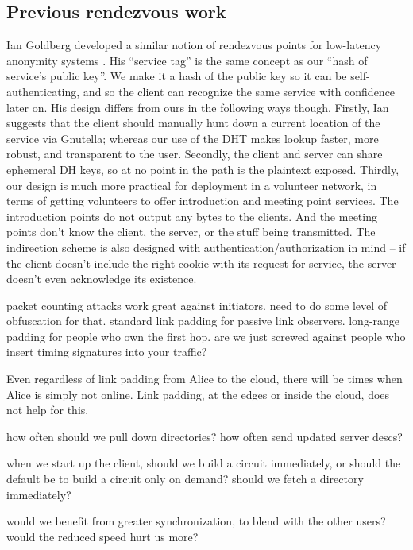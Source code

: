 \documentclass[times,10pt,twocolumn]{article}
\begin{document}
\subsection{Previous rendezvous work}

Ian Goldberg developed a similar notion of rendezvous points for
low-latency anonymity systems \cite{ian-thesis}. His ``service tag''
is the same concept as our ``hash of service's public key''. We make it
a hash of the public key so it can be self-authenticating, and so the
client can recognize the same service with confidence later on. His
design differs from ours in the following ways though. Firstly, Ian
suggests that the client should manually hunt down a current location of
the service via Gnutella; whereas our use of the DHT makes lookup faster,
more robust, and transparent to the user. Secondly, the client and server
can share ephemeral DH keys, so at no point in the path is the plaintext
exposed. Thirdly, our design is much more practical for deployment in a
volunteer network, in terms of getting volunteers to offer introduction
and meeting point services. The introduction points do not output any
bytes to the clients. And the meeting points don't know the client,
the server, or the stuff being transmitted. The indirection scheme
is also designed with authentication/authorization in mind -- if the
client doesn't include the right cookie with its request for service,
the server doesn't even acknowledge its existence.

\label{sec:maintaining-anonymity}

packet counting attacks work great against initiators. need to do some
level of obfuscation for that. standard link padding for passive link
observers. long-range padding for people who own the first hop. are
we just screwed against people who insert timing signatures into your
traffic?

Even regardless of link padding from Alice to the cloud, there will be
times when Alice is simply not online. Link padding, at the edges or
inside the cloud, does not help for this.

how often should we pull down directories? how often send updated
server descs?

when we start up the client, should we build a circuit immediately,
or should the default be to build a circuit only on demand? should we
fetch a directory immediately?

would we benefit from greater synchronization, to blend with the other
users? would the reduced speed hurt us more?
\end{document}
